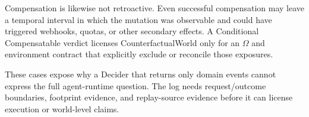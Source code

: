 Compensation is likewise not retroactive.  Even successful compensation may
leave a temporal interval in which the mutation was observable and could have
triggered webhooks, quotas, or other secondary effects.  A Conditional
Compensatable verdict licenses CounterfactualWorld only for an $\Omega$ and
environment contract that explicitly exclude or reconcile those exposures.

These cases expose why a Decider that returns only domain events cannot express
the full agent-runtime question.  The log needs request/outcome boundaries,
footprint evidence, and replay-source evidence before it can license execution
or world-level claims.
